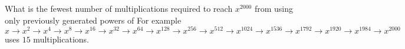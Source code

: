 What is the fewest number of multiplications required to reach $x^{2000}$ from  using only previously generated powers of  For example $x\rightarrow x^{2}\rightarrow x^{4}\rightarrow x^{8}\rightarrow x^{16}\rightarrow x^{32}\rightarrow x^{64}\rightarrow x^{128}\rightarrow x^{256}\rightarrow x^{512}\rightarrow x^{1024}\rightarrow x^{1536}\rightarrow x^{1792}\rightarrow x^{1920}\rightarrow x^{1984}\rightarrow x^{2000}$ uses $15$ multiplications.